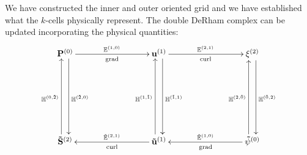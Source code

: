 We have constructed the inner and outer oriented grid and we have established what the $k$-cells physically represent. The double DeRham complex can be updated incorporating the physical quantities:
\begin{equation}
    \begin{gathered}
        \xymatrix@=20ex{
            \mathbf{P}^{(0)} \ar[r]^{\mathbb{E}^{(1,0)}}_{\text{grad}} \ar@<1ex>[d]^{\mathbb{H}^{(\tilde{2},0)}} & \mathbf{u}^{(1)} \ar[r]^{\mathbb{E}^{(2,1)}}_{\text{curl}} \ar@<1ex>[d]^{\mathbb{H}^{(\tilde{1},1)}} & \mathbf{\xi}^{(2)} \ar@<1ex>[d]^{\mathbb{H}^{(\tilde{0},2)}} \\
            \mathbf{\tilde{S}}^{(2)} \ar@<1ex>[u]^{\mathbb{H}^{(0,\tilde{2})}} & \mathbf{\tilde{u}}^{(1)} \ar[l]_{\tilde{\mathbb{E}}^{(2, 1)}}^{\text{curl}} \ar@<1ex>[u]^{\mathbb{H}^{(1,\tilde{1})}} & \mathbf{\tilde{\psi}}^{(0)} \ar[l]_{\tilde{\mathbb{E}}^{(1,0)}}^{\text{grad}} \ar@<1ex>[u]^{\mathbb{H}^{(2,\tilde{0})}}
        }
    \end{gathered}
\end{equation}
